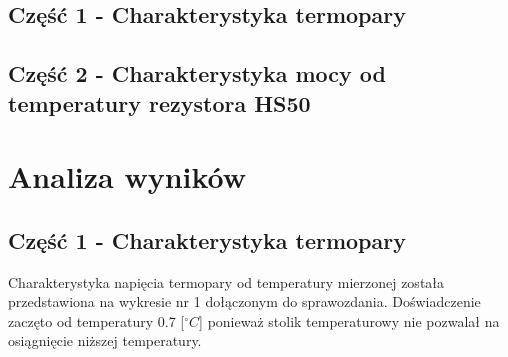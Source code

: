 \documentclass[11pt]{article}
\begin{document}
    \subsection*{Część 1 - Charakterystyka termopary}
    \begin{center}
    \end{center}
    \subsection*{Część 2 - Charakterystyka mocy od temperatury rezystora HS50}
    \begin{center}
    \end{center}
    
    \section{Analiza wyników}
    \subsection*{Część 1 - Charakterystyka termopary}
    Charakterystyka napięcia termopary od temperatury mierzonej została przedstawiona na wykresie nr 1 dołączonym do sprawozdania. Doświadczenie zaczęto od temperatury
    0.7 [${^\circ}C$] ponieważ stolik temperaturowy nie pozwalał na osiągnięcie niższej temperatury.
\end{document}
